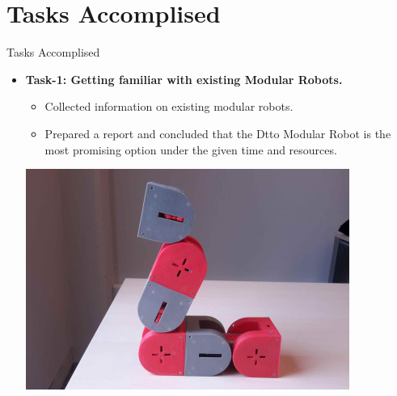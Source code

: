\documentclass[10pt, a4paper]{beamer}
\begin{document}
\section{Tasks Accomplised}
\begin{frame}{Tasks Accomplised}
	\begin{itemize}
		\item \textbf{Task-1: Getting familiar with existing Modular Robots.}
		  \begin{itemize}
		  \item Collected information on existing modular robots.
		  \item Prepared a report and concluded that the Dtto Modular Robot is the most promising option under the given time and resources.
           \end{itemize}
           \vspace{15pt}
        \centering\includegraphics[scale=0.4]{dtto.jpg}   
		
	\end{itemize}
\end{frame}
\end{document}

